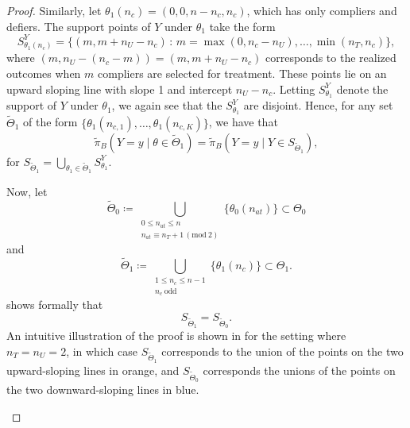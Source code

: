 \documentclass[12pt,reqno]{amsart}
\theoremstyle{theorem}
\theoremstyle{definition}
\newcommand{\0}{\mathbf{0}}
\newcommand{\1}{\mathbf{1}}
\begin{document}
\begin{proof}
Similarly, let $\theta_1(n_c) = (0,0,n-n_{c},n_{c})$, which has only compliers and defiers. The support points of $Y$ under
$\theta_1$ take the form 
\begin{equation}
    S^Y_{\theta_1(n_{c})} = \{(m, m + n_U - n_c) \,:\,  m=\max(0, n_c - n_U),\ldots,\min
(n_T,n_c) \} , \label{eqn:s1} 
\end{equation}
where $(m,n_U-(n_c-m)) = (m,m + n_U - n_c)$ corresponds to the realized outcomes when $m$ compliers are selected for treatment. These points lie
on an upward sloping line with slope 1 and intercept $n_U - n_c$. 
Letting $S^{Y}_{\theta_1}$ denote
the support of $Y$ under $\theta_1$, we again see that the $S^{Y}_{\theta_1}$ are
disjoint. Hence, for any set $\tilde{\Theta}_1$ of the form $\{ \theta_1(n_{c,1}), \ldots, \theta_1(n_{c,K}) \}$, we have that $$\tilde{\pi}_{B}(Y=y \mid
\theta \in \tilde{\Theta}_1) = \tilde{\pi}_B( Y=y \mid Y \in
S_{\tilde{\Theta}_1}),$$ for $S_{\tilde{\Theta}_1} = \bigcup_{\theta_1 \in \tilde\Theta_1}
S^{Y}_{\theta_1}$.

Now, let  
\begin{equation}
\tilde\Theta_0 \coloneqq \bigcup_{\substack{0\le n_{at}\le n\\ n_{at}\equiv n_T+1\, (\mathrm{mod}\ 2)}} \{\theta_0(n_{at})\} \subset \Theta_0    \label{eqn:defTildeTheta0}
\end{equation}
and
\begin{equation}
 \tilde\Theta_1 \coloneqq \bigcup_{\substack{1\le n_c\le n-1\\ n_c\ \mathrm{odd}}} \{\theta_1(n_c)\} \subset \Theta_1. \label{eqn:defTildeTheta1}   
\end{equation}
 shows formally that \[
S_{\tilde{\Theta}_1} = S_{\tilde{\Theta}_0}. 
\]
\noindent An intuitive illustration of the proof is shown in  for the setting where $n_T=n_U=2$, in which case $S_{\tilde{\Theta}_1}$ corresponds to the union of the points on the two upward-sloping lines in orange, and $S_{\tilde{\Theta}_0}$ corresponds the unions of the points on the two downward-sloping lines in blue.

\begin{figure}[!ht]
    \centering
\end{figure}
\end{proof}
\end{document}
